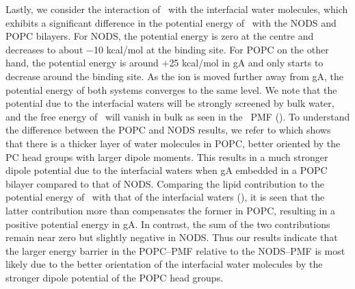 Lastly, we consider the interaction of \K\ with the interfacial water molecules, which exhibits a
significant difference in the potential energy of \K\ with the NODS and POPC bilayers. For NODS, the 
potential energy is zero at the centre and decreases to about $-$10 kcal/mol at the binding site. 
For POPC on the other hand, the potential energy is around $+$25 kcal/mol in gA and only starts to 
decrease around the binding site. As the ion is moved further away from gA, the potential energy of 
both systems converges to the same level. We note that the potential due to the interfacial waters 
will be strongly screened by bulk water, and the free energy of \K\ will vanish in bulk as seen in 
the \K\ PMF (). To understand the difference between the POPC and NODS results, we 
refer to  which shows that there is a thicker layer of water molecules in POPC, 
better oriented by the PC head groups with larger dipole moments. This results in a much stronger 
dipole potential due to the interfacial waters when gA embedded in a POPC bilayer compared to that 
of NODS. Comparing the lipid contribution to the potential energy of \K\ with that of the interfacial 
waters (), it is seen that the latter contribution more than compensates the former 
in POPC, resulting in a positive potential energy in gA. In contrast, the sum of the two contributions 
remain near zero but slightly negative in NODS. Thus our results indicate that the larger energy 
barrier in the POPC--PMF relative to the NODS--PMF is most likely due to the better orientation of 
the interfacial water molecules by the stronger dipole potential of the POPC head groups.

